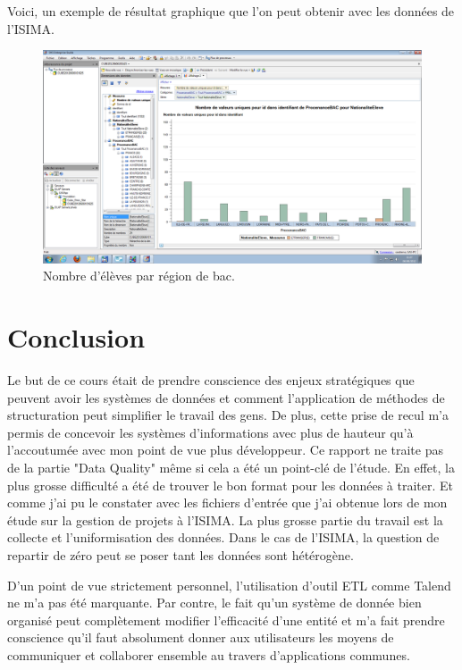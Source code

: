 \documentclass[a4paper,11pt]{report}
\begin{document}
\normalsize{
\noindent
Voici, un exemple de résultat graphique que l'on peut obtenir avec les données de l'ISIMA.
}

\begin{figure}[h]
   \begin{center}
   \includegraphics[scale =0.35]{resultatNatCube.png}
   \end{center}
  \caption{Nombre d'élèves par région de bac.}
\end{figure}

\chapter{Conclusion}

\normalsize{
Le but de ce cours était de prendre conscience des enjeux stratégiques que peuvent avoir les systèmes de données et comment l'application de méthodes de structuration peut simplifier le travail des gens. De plus, cette prise de recul m'a permis de concevoir les systèmes d'informations avec plus de hauteur qu'à l'accoutumée avec mon point de vue plus développeur.
Ce rapport ne traite pas de la partie "Data Quality" même si cela a été un point-clé de l'étude. En effet, la plus grosse difficulté a été de trouver le bon format pour les données à traiter. Et comme j'ai pu le constater avec les fichiers d'entrée que j'ai obtenue lors de mon étude sur la gestion de projets à l'ISIMA. La plus grosse partie du travail est la collecte et l'uniformisation des données. Dans le cas de l'ISIMA, la question de repartir de zéro peut se poser tant les données sont hétérogène.
}

\normalsize{
D'un point de vue strictement personnel, l'utilisation d'outil ETL comme Talend ne m'a pas été marquante. Par contre, le fait qu'un système de donnée bien organisé peut complètement modifier l'efficacité d'une entité et m'a fait prendre conscience qu'il faut absolument donner aux utilisateurs les moyens de communiquer et collaborer ensemble au travers d'applications communes. 
}
\end{document}
